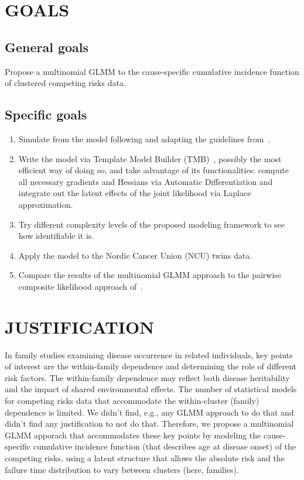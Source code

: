 \section{GOALS}

\subsection{General goals}

Propose a multinomial GLMM to the cause-specific cumulative incidence
function of clustered competing risks data.

\subsection{Specific goals}

\begin{enumerate}
\item Simulate from the model following and adapting the guidelines
  from~.

\item Write the model via Template Model Builder (TMB)~\cite{TMB},
  possibly the most efficient way of doing so, and take advantage of its
  functionalities: compute all necessary gradients and Hessians via
  Automatic Differentiation and integrate out the latent effects of the
  joint likelihood via Laplace approximation.

\item Try different complexity levels of the proposed modeling framework
  to see how identifiable it is.

\item Apply the model to the Nordic Cancer Union (NCU) twins data.

\item Compare the results of the multinomial GLMM approach to the
  pairwise composite likelihood approach of~.
\end{enumerate}

\section{JUSTIFICATION}

In family studies examining disease occurrence in related individuals,
key points of interest are the within-family dependence and determining
the role of different risk factors. The within-family dependence may
reflect both disease heritability and the impact of shared environmental
effects. The number of statistical models for competing risks data that
accommodate the within-cluster (family) dependence is limited. We didn't
find, e.g., any GLMM approach to do that and didn't find any
justification to not do that. Therefore, we propose a multinomial GLMM
apporach that accommodates these key points by modeling the
cause-specific cumulative incidence function (that describes age at
disease onset) of the competing risks, using a latent structure that
allows the absolute risk and the failure time distribution to vary
between clusters (here, families).


